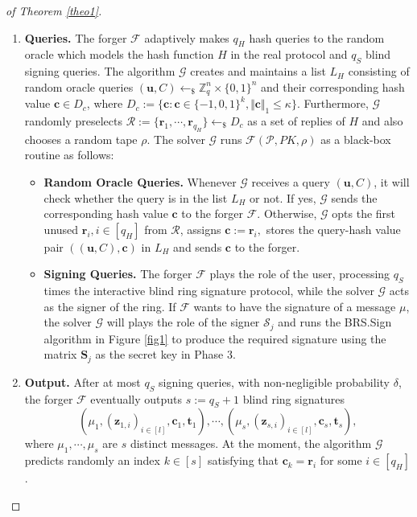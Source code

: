 \documentclass[runningheads]{llncs}
\begin{document}
\begin{proof}[of Theorem \ref{theo1}]
\begin{enumerate}
		
		\item \textbf{Queries.} The forger $\mathcal{F}$ adaptively makes $q_H$ hash queries to the random oracle which models the hash function $H$ in the real protocol and $q_S$ blind signing queries. 
		The algorithm $\mathcal{G}$ creates and maintains a list $L_H$ consisting of random oracle queries $(\mathbf{u}, C)\leftarrow_{\$} \mathbb{Z}_q^{n} \times \{0,1\}^n$ and their corresponding hash value $ \mathbf{c} \in D_{c}$, where $D_c:=\{ \mathbf{c}: \mathbf{c}\in \{-1,0,1\} ^{k}, \Vert \mathbf{c} \Vert_1 \leq \kappa \}$. Furthermore,  $\mathcal{G}$ randomly preselects $\mathcal{R}:=\{\mathbf{r}_1, \cdots, \mathbf{r}_{q_H} \} \leftarrow_{\$} D_c$ as a set of replies of $H$ and also chooses a random tape $\rho$. The solver $\mathcal{G}$ runs $\mathcal{F}(\mathcal{P}, PK, \rho)$ as a black-box routine as follows:
		\begin{itemize}
			\item \textbf{Random Oracle Queries.} Whenever $\mathcal{G}$ receives a query $(\mathbf{u}, C)$, it will check whether the query is in the list $L_H$ or not. If yes, $\mathcal{G}$ sends the corresponding hash value $\mathbf{c}$ to the forger $\mathcal{F}$. Otherwise, $\mathcal{G}$ opts the first unused $\mathbf{r}_i, i\in [q_H]$ from $\mathcal{R}$, assigns $\mathbf{c}:=\mathbf{r}_i,$ stores the query-hash value pair $((\mathbf{u}, C), \mathbf{c})$ in $L_H$ and sends $\mathbf{c}$ to the forger. 
			\item 	\textbf{Signing Queries.} The forger $\mathcal{F}$ plays the role of the user, processing $q_S$ times the interactive blind ring signature protocol, while the solver $\mathcal{G}$ acts as the signer of the ring. If $\mathcal{F}$ wants to have the signature of a message $\mu$, the solver $\mathcal{G}$ will plays the role of the signer $\mathcal{S}_j$ and runs the \textsf{BRS.Sign} algorithm in Figure \ref{fig1} to  produce the required signature using the matrix $\textbf{S}_j$ as the secret key in Phase 3.
		\end{itemize}
		
		\item 
		\textbf{Output.} After at most $q_S$ signing queries,  with non-negligible probability $\delta$, the forger $\mathcal{F}$ eventually outputs $s:=q_S+1$  blind ring signatures $$(\mu_1, (\mathbf{z}_{1,i})_{i \in [l]}, \mathbf{c}_1, \mathbf{t}_1), \cdots, (\mu_s, (\mathbf{z}_{s,i})_{i \in [l]}, \mathbf{c}_s, \mathbf{t}_s),$$ where $\mu_1, \cdots, \mu_s$ are $s$ distinct messages. At the moment, the algorithm $\mathcal{G}$ predicts randomly an index $k \in [s]$ satisfying that $\mathbf{c}_k=\mathbf{r}_i$ for some $i \in [q_H]$. 
		

\end{enumerate}
\end{proof}
\end{document}
